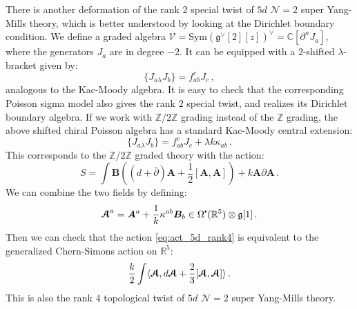 \documentclass[11pt]{article}
\newcommand{\C}{\mathbb{C}}
\newcommand{\R}{\mathbb{R}}
\newcommand{\Z}{\mathbb{Z}}
\newcommand\sbullet[1][.5]{\mathbin{\vcenter{\hbox{\scalebox{#1}{$\bullet$}}}}}
\numberwithin{equation}{section}
\begin{document}
There is another deformation of the rank $2$ special twist of $5d$ $\mathcal{N} = 2$ super Yang-Mills theory, which is better understood by looking at the Dirichlet boundary condition. We define a graded algebra $\mathcal{V} = \mathrm{Sym}(\mathfrak{g}^{\vee}[2][z])^\vee = \C[\partial^n J_a]$, where the generators $J_a$ are in degree $-2$. It can be equipped with a $2$-shifted $\lambda$-bracket given by:
 \begin{equation}
 	\{J_{a\lambda}J_b\} = f_{ab}^cJ_c\,,
 \end{equation}
 analogous to the Kac-Moody algebra. It is easy to check that the corresponding Poisson sigma model also gives the rank $2$ special twist, and realizes its Dirichlet boundary algebra. If we work with $\Z/2\Z$ grading instead of the $\Z$ grading, the above shifted chiral Poisson algebra has a standard Kac-Moody central extension:
    \begin{equation}
  	\{J_{a\lambda}J_b\} = f_{ab}^cJ_c + \lambda k\kappa_{ab}\,.
  \end{equation}
  This corresponds to the $\Z/2\Z$ graded theory with the action:
   \begin{equation}\label{eq:act_5d_rank4}
 	S = \int \boldsymbol{B}\left( (d+\bar{\partial})\boldsymbol{A} + \frac{1}{2}[\boldsymbol{A},\boldsymbol{A}]\right) + k\boldsymbol{A}\partial \boldsymbol{A}\,.
 \end{equation} 
 We can combine the two fields by defining:
 \begin{equation}
 	\boldsymbol{\EuScript{A}}^a = \boldsymbol{A}^a + \frac{1}{k}\kappa^{ab}\boldsymbol{B}_b \in \Omega^{\sbullet}(\R^5)\otimes \mathfrak{g}[1]\,.
 \end{equation}
 Then we can check that the action \eqref{eq:act_5d_rank4} is equivalent to the generalized Chern-Simons action on $\R^5$:
 \begin{equation}
 	\frac{k}{2} \int \langle\boldsymbol{\EuScript{A}}, d\boldsymbol{\EuScript{A}} + \frac{2}{3}[\boldsymbol{\EuScript{A}},\boldsymbol{\EuScript{A}}] \rangle\,.
 \end{equation} 
This is also the rank $4$ topological twist of $5d$ $\mathcal{N} = 2$ super Yang-Mills theory.
 
\end{document}
